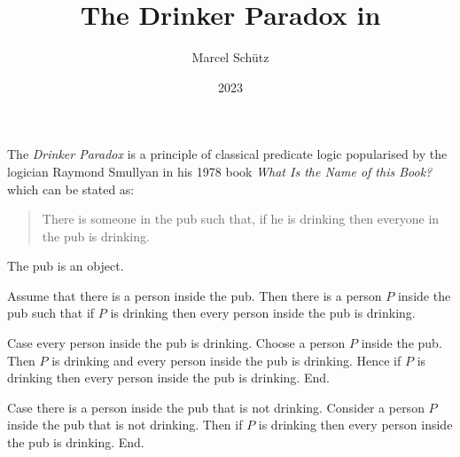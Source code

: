 \documentclass{stex}
\title{The Drinker Paradox in \Naproche}
\author{Marcel Schütz}
\date{2023}
\begin{document}
\maketitle


\noindent The \emph{Drinker Paradox} is a principle of classical predicate logic popularised by the logician Raymond Smullyan in his 1978 book \textit{What Is the Name of this Book?} \cite{Smullyan1978} which can be stated as:

\begin{quotation}
  \noindent There is someone in the pub such that, if he is drinking then everyone in the pub is drinking.
\end{quotation}

\begin{fsignature*}
  The pub is an object.
\end{fsignature*}

\begin{ftheorem*}[label=drinker_paradox,title=Drinker Paradox]
  Assume that there is a person inside the pub.
  Then there is a person $P$ inside the pub such that if $P$ is drinking then every person inside the pub is drinking.
\end{ftheorem*}
\begin{fproof}[method=case analysis]
  Case every person inside the pub is drinking.
    Choose a person $P$ inside the pub.
    Then $P$ is drinking and every person inside the pub is drinking.
    Hence if $P$ is drinking then every person inside the pub is drinking.
  End.

  Case there is a person inside the pub that is not drinking.
    Consider a person $P$ inside the pub that is not drinking.
    Then if $P$ is drinking then every person inside the pub is drinking.
  End.
\end{fproof}

\printbibliography
\end{document}
